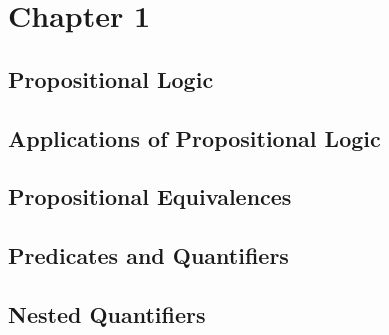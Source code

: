\documentclass{article}
\begin{document}
\newcommand{\hr}{\par\noindent\rule{\textwidth}{0.4pt}}

\newcommand{\bc}[1]{
	\begin{equation*}
		\begin{boxed}
			{#1}
		\end{boxed}
	\end{equation*}
}

\newcommand{\cond}[2]{
	\ifmmode
		{#1} \quad {#2}
	\else
		$$ {#1} \quad {#2} $$
	\fi
}

\newcommand{\matr}[1]{
	\ifmmode \bm{#1}
	\else \textit{\textbf{#1}}
	\fi
}
\newcommand{\vect}[1]{
	\ifmmode \mathbf{#1}
	\else \textbf{#1}
	\fi
}


\tableofcontents

\section{Chapter 1}

\subsection{Propositional Logic}

\subsection{Applications of Propositional Logic}

\subsection{Propositional Equivalences}

\subsection{Predicates and Quantifiers}

\subsection{Nested Quantifiers}
\end{document}
